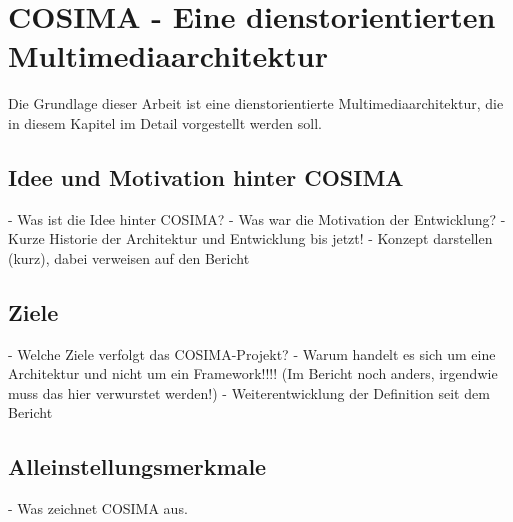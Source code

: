 
\chapter{COSIMA - Eine dienstorientierten Multimediaarchitektur} %
\label{cha:eine_dienstorientierten_multimediaarchitektur}

  Die Grundlage dieser Arbeit ist eine dienstorientierte Multimediaarchitektur, die in diesem Kapitel im Detail vorgestellt werden soll.
  
\section{Idee und Motivation hinter COSIMA} %
\label{sec:idee_und_motivation_hinter_cosima}

  - Was ist die Idee hinter COSIMA?
  - Was war die Motivation der Entwicklung?
  - Kurze Historie der Architektur und Entwicklung bis jetzt!
  - Konzept darstellen (kurz), dabei verweisen auf den Bericht


\section{Ziele} %
\label{sec:ziele}

  - Welche Ziele verfolgt das COSIMA-Projekt?
  - Warum handelt es sich um eine Architektur und nicht um ein Framework!!!! (Im Bericht noch anders, irgendwie muss das hier verwurstet werden!)
  - Weiterentwicklung der Definition seit dem Bericht


\section{Alleinstellungsmerkmale} %
\label{sec:alleinstellungsmerkmale}

  - Was zeichnet COSIMA aus.
  
